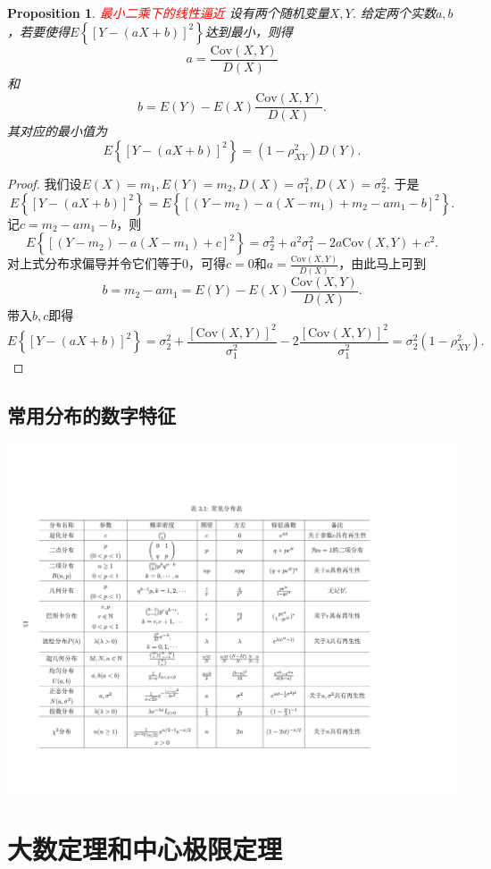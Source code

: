 \documentclass{article}
\newtheorem{proposition}[theorem]{Proposition}
\newcommand{\redt}[1]{\textcolor{red}{#1}}
\begin{document}
\begin{proposition}
\rm \redt{最小二乘下的线性逼近} 设有两个随机变量$X,Y$. 给定两个实数$a,b$，若要使得$E\left\{\left[Y-(aX+b) \right]^2\right\}$达到最小，则得
$$
a  = \frac{\text{Cov}(X,Y)}{D(X)}
$$
和
$$
b = E(Y)-E(X)\frac{\text{Cov}(X,Y)}{D(X)}.
$$
其对应的最小值为
$$
E\left\{\left[Y-(aX+b) \right]^2\right\} = (1-\rho_{XY}^2)D(Y).
$$
\end{proposition}

\begin{proof}
我们设$E(X)=m_1,E(Y)=m_2,D(X)=\sigma_1^2,D(X)=\sigma_2^2$. 于是
$$
E\left\{\left[Y-(aX+b) \right]^2\right\} = E\left\{\left[(Y-m_2)-a(X-m_1)+ m_2 -am_1 - b \right]^2\right\}.
$$
记$c = m_2 -am_1 - b$，则
$$
E\left\{\left[(Y-m_2)-a(X-m_1)+ c \right]^2\right\} = \sigma_2^2 + a^2\sigma_1^2-2a\text{Cov}(X,Y) + c^2 .
$$
对上式分布求偏导并令它们等于0，可得$c=0$和$a = \frac{\text{Cov}(X,Y)}{D(X)}$，由此马上可到
$$
b = m_2-am_1 = E(Y)-E(X)\frac{\text{Cov}(X,Y)}{D(X)}.
$$
带入$b,c$即得
$$
E\left\{\left[Y-(aX+b) \right]^2\right\} = \sigma_2^2 + \frac{[\text{Cov}(X,Y)]^2}{\sigma_1^2}-2\frac{[\text{Cov}(X,Y)]^2}{\sigma_1^2} = \sigma_2^2(1-\rho_{XY}^2).
$$
\end{proof}

\subsection{常用分布的数字特征}
\includegraphics[scale=0.2]{images/regular_distribution_characterize.jpg}

\section{大数定理和中心极限定理}
\end{document}
